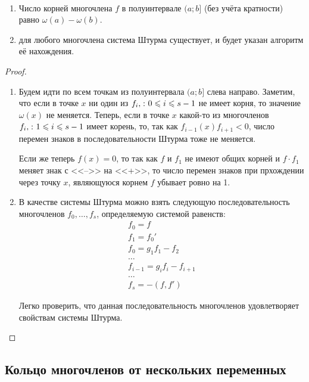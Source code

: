 \begin{theorem}[Штурма]\par\strut\\
  \begin{enumerate}
    \item Число корней многочлена $f$ в полуинтервале $(a;b]$ (без учёта кратности) равно $\omega(a)-\omega(b)$.
    \item для любого многочлена система Штурма существует, и будет указан алгоритм её нахождения.
  \end{enumerate}
\end{theorem}
\begin{proof}\par\strut\\
  \begin{enumerate}
    \item Будем идти по всем точкам из полуинтервала $(a;b]$ слева направо. Заметим, что если в точке $x$ ни один из $f_i,\spc 0\bw\le i\bw\le s-1$ не имеет корня, то значение $\omega(x)$ не меняется. Теперь, если в точке $x$ какой-то из многочленов $f_i,\spc 1\bw\le i\bw\le s-1$ имеет корень, то, так как $f_{i-1}(x)f_{i+1}<0$, число перемен знаков в последовательности Штурма тоже не меняется.
    
    Если же теперь $f(x)=0$, то так как $f$ и $f_1$ не имеют общих корней и $f\cdot f_1$ меняет знак с <<-->> на <<+>>, то число перемен знаков при прхождении через точку $x$, являющуюся корнем $f$ убывает ровно на 1.
    \item В качестве системы Штурма можно взять следующую последовательность многочленов $f_0,\dots,f_s$, определяемую системой равенств:
    \begin{gather*}
      f_0 = f\\
      f_1 = f_0'\\
      f_0 = g_1f_1 - f_2\\
      \dots\\
      f_{i-1} = g_if_i - f_{i+1}\\
      \dots\\
      f_s = - (f,f')
    \end{gather*}
    
    Легко проверить, что данная последовательность многочленов удовлетворяет свойствам системы Штурма.
  \end{enumerate}
\end{proof}

\subsection{Кольцо многочленов от нескольких переменных}

